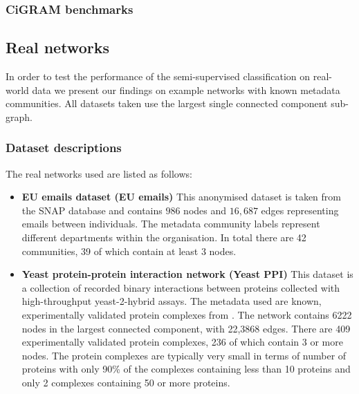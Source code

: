 \documentclass[a4paper,10pt]{article}
\begin{document}
\subsubsection{CiGRAM benchmarks}

\subsection{Real networks}
In order to test the performance of the semi-supervised classification on real-world data we present our findings on example networks with known metadata communities.
All datasets taken use the largest single connected component sub-graph.

\subsubsection{Dataset descriptions}
\label{sec:real_network_descs}
The real networks used are listed as follows:
\begin{itemize}
 \item \textbf{EU emails dataset (EU emails)} This anonymised dataset is taken from the SNAP database \cite{snap} and contains $986$ nodes and $16,687$ edges representing emails between individuals.
 The metadata community labels represent different departments within the organisation.
 In total there are 42 communities, 39 of which contain at least 3 nodes.
 
 \item \textbf{Yeast protein-protein interaction network (Yeast PPI)} \cite{yeast_ppi}
 This dataset is a collection of recorded binary interactions between proteins collected with high-throughput yeast-2-hybrid assays.
 The metadata used are known, experimentally validated protein complexes from \cite{yeast_ppi_complexes}.
 The network contains 6222 nodes in the largest connected component, with 22,3868 edges.
 There are 409 experimentally validated protein complexes, 236 of which contain 3 or more nodes.
 The protein complexes are typically very small in terms of number of proteins with only 90\% of the complexes containing less than 10 proteins and only 2 complexes containing 50 or more proteins.
 
\end{itemize}
\end{document}

